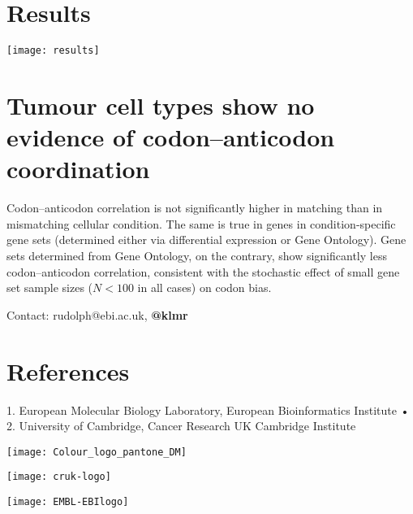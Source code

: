 \documentclass[a0,portrait]{a0poster}
\begin{document}
\vspace{2cm}
\begin{minipage}{\textwidth}
    \begin{minipage}[t]{0.48\textwidth}
        \section*{Results}
        \texttt{[image: results]}
    \end{minipage}%
    \hfill%
    \begin{minipage}[t][][t]{0.48\textwidth}
        \LARGE
        \section*{Tumour cell types show no evidence of codon--anticodon coordination}
        Codon--anticodon correlation is not significantly higher in matching
        than in mismatching cellular condition. The same is true in genes in
        condition-specific gene sets (determined either via differential
        expression or Gene Ontology). Gene sets determined from Gene Ontology,
        on the contrary, show significantly less codon--anticodon correlation,
        consistent with the stochastic effect of small gene set sample sizes
        (\(N<100\) in all cases) on codon bias.

        \vspace{7cm}
        \hfill Contact: rudolph@ebi.ac.uk, \textbf{@klmr}
    \end{minipage}%
\end{minipage}

\vspace{2cm}
\section*{References}
\vspace{-1cm}
\begin{multicols}{2}
    \renewcommand\section[2]{}
    
\end{multicols}

\vfill
\noindent
\begin{center}
\normalsize%
1. European Molecular Biology Laboratory, European Bioinformatics Institute •
2. University of Cambridge, Cancer Research UK Cambridge Institute
\end{center}
\vspace{1cm}

\noindent
\begin{minipage}[][][b]{0.3\textwidth}
    \centering
    \texttt{[image: Colour\_logo\_pantone\_DM]}
\end{minipage}%
\hfill%
\begin{minipage}[][][b]{0.3\textwidth}
    \centering
    \texttt{[image: cruk-logo]}
\end{minipage}%
\hfill%
\begin{minipage}[][][b]{0.3\textwidth}
    \centering
    \texttt{[image: EMBL-EBIlogo]}
\end{minipage}%
\end{document}
